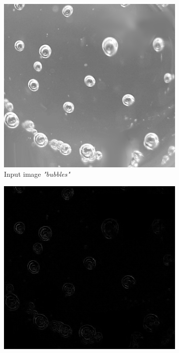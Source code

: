 \documentclass{article}
\begin{document}
\begin{figure}[h]
    \centering
    \caption{Results of testing \textsc{IPfilter}}
    \label{fig:filterResults}
    \begin{subfigure}[t]{0.32\textwidth}
        \centering
        \includegraphics[width=\textwidth]{Assignment_1/input_images/bubbles.png}
        \caption{Input image \textit{"bubbles"}}
        \label{fig:orginalBubbles}
    \end{subfigure}
    \hfill
    \begin{subfigure}[t]{0.32\textwidth}
        \centering
        \includegraphics[width=\textwidth]{Assignment_1/output_images/filter_kevin.png}

\end{subfigure}
\end{figure}
\end{document}
